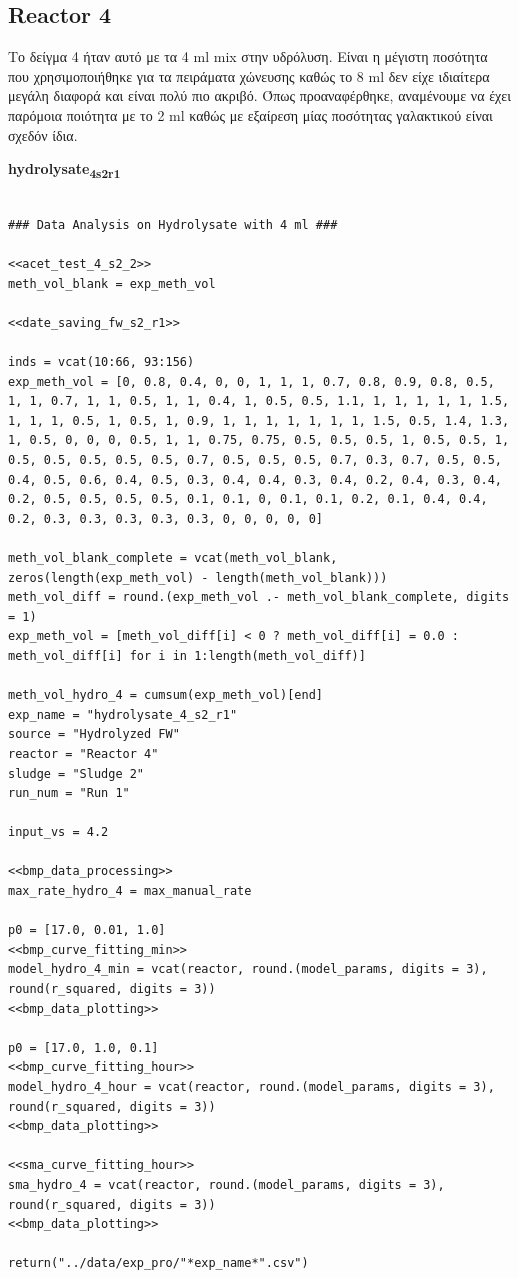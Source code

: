 \documentclass[11pt]{article}
\begin{document}
\subsection{Reactor 4}
\label{sec:orgfd10ec0}
Το δείγμα 4 ήταν αυτό με τα 4 ml mix στην υδρόλυση. Είναι η μέγιστη ποσότητα που χρησιμοποιήθηκε για τα πειράματα χώνευσης καθώς το 8 ml δεν είχε ιδιαίτερα μεγάλη διαφορά και είναι πολύ πιο ακριβό. Όπως προαναφέρθηκε, αναμένουμε να έχει παρόμοια ποιότητα με το 2 ml καθώς με εξαίρεση μίας ποσότητας γαλακτικού είναι σχεδόν ίδια.

\textbf{hydrolysate\textsubscript{4}\textsubscript{s2}\textsubscript{r1}}
\begin{verbatim}

### Data Analysis on Hydrolysate with 4 ml ###

<<acet_test_4_s2_2>>
meth_vol_blank = exp_meth_vol

<<date_saving_fw_s2_r1>>

inds = vcat(10:66, 93:156)
exp_meth_vol = [0, 0.8, 0.4, 0, 0, 1, 1, 1, 0.7, 0.8, 0.9, 0.8, 0.5, 1, 1, 0.7, 1, 1, 0.5, 1, 1, 0.4, 1, 0.5, 0.5, 1.1, 1, 1, 1, 1, 1, 1.5, 1, 1, 1, 0.5, 1, 0.5, 1, 0.9, 1, 1, 1, 1, 1, 1, 1, 1.5, 0.5, 1.4, 1.3, 1, 0.5, 0, 0, 0, 0.5, 1, 1, 0.75, 0.75, 0.5, 0.5, 0.5, 1, 0.5, 0.5, 1, 0.5, 0.5, 0.5, 0.5, 0.5, 0.7, 0.5, 0.5, 0.5, 0.7, 0.3, 0.7, 0.5, 0.5, 0.4, 0.5, 0.6, 0.4, 0.5, 0.3, 0.4, 0.4, 0.3, 0.4, 0.2, 0.4, 0.3, 0.4, 0.2, 0.5, 0.5, 0.5, 0.5, 0.1, 0.1, 0, 0.1, 0.1, 0.2, 0.1, 0.4, 0.4, 0.2, 0.3, 0.3, 0.3, 0.3, 0.3, 0, 0, 0, 0, 0]

meth_vol_blank_complete = vcat(meth_vol_blank, zeros(length(exp_meth_vol) - length(meth_vol_blank)))
meth_vol_diff = round.(exp_meth_vol .- meth_vol_blank_complete, digits = 1)
exp_meth_vol = [meth_vol_diff[i] < 0 ? meth_vol_diff[i] = 0.0 : meth_vol_diff[i] for i in 1:length(meth_vol_diff)]

meth_vol_hydro_4 = cumsum(exp_meth_vol)[end]
exp_name = "hydrolysate_4_s2_r1"
source = "Hydrolyzed FW"
reactor = "Reactor 4"
sludge = "Sludge 2"
run_num = "Run 1"

input_vs = 4.2

<<bmp_data_processing>>
max_rate_hydro_4 = max_manual_rate

p0 = [17.0, 0.01, 1.0]
<<bmp_curve_fitting_min>>
model_hydro_4_min = vcat(reactor, round.(model_params, digits = 3), round(r_squared, digits = 3))
<<bmp_data_plotting>>

p0 = [17.0, 1.0, 0.1]
<<bmp_curve_fitting_hour>>
model_hydro_4_hour = vcat(reactor, round.(model_params, digits = 3), round(r_squared, digits = 3))
<<bmp_data_plotting>>

<<sma_curve_fitting_hour>>
sma_hydro_4 = vcat(reactor, round.(model_params, digits = 3), round(r_squared, digits = 3))
<<bmp_data_plotting>>

return("../data/exp_pro/"*exp_name*".csv")
\end{verbatim}
\end{document}
